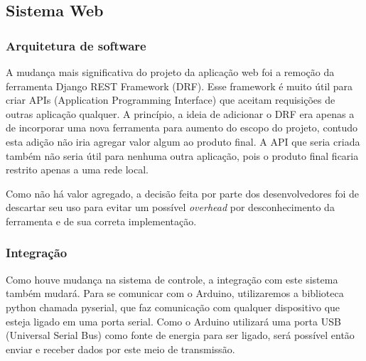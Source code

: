 \subsection{Sistema Web}
\subsubsection{Arquitetura de software}
A mudança mais significativa do projeto da aplicação web foi a remoção da ferramenta Django REST Framework (DRF). Esse framework é muito útil para criar APIs (Application Programming Interface) que aceitam requisições de outras aplicação qualquer. A princípio, a ideia de adicionar o DRF era apenas a de incorporar uma nova ferramenta para aumento do escopo do projeto, contudo esta adição não iria agregar valor algum ao produto final. A API que seria criada também não seria útil para nenhuma outra aplicação, pois o produto final ficaria restrito apenas a uma rede local.

Como não há valor agregado, a decisão feita por parte dos desenvolvedores foi de descartar seu uso para evitar um possível \textit{overhead} por desconhecimento da ferramenta e de sua correta implementação.

\subsubsection{Integração}
Como houve mudança na sistema de controle, a integração com este sistema também mudará. Para se comunicar com o Arduino, utilizaremos a biblioteca python chamada pyserial, que faz comunicação com qualquer dispositivo que esteja ligado em uma porta serial. Como o Arduino utilizará uma porta USB (Universal Serial Bus) como fonte de energia para ser ligado, será possível então enviar e receber dados por este meio de transmissão.